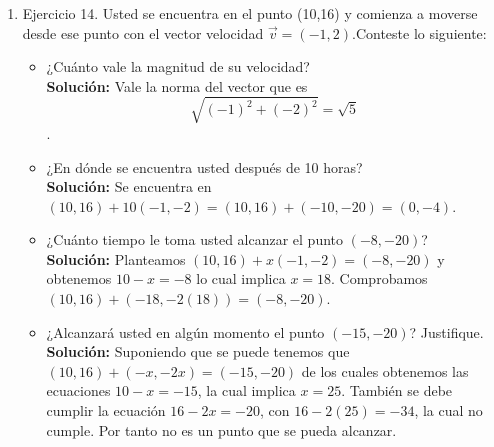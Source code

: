 \documentclass[10pt,letterpaper,fleqn]{article}
\begin{document}
\begin{enumerate}
\begin{enumerate}
        \end{enumerate}

        \item Ejercicio 14. Usted se encuentra en el punto (10,16) y comienza a moverse desde ese punto con el vector velocidad $\overrightarrow{v}=(-1,2)$.Conteste lo siguiente:
        \begin{itemize}

            \item ¿Cuánto vale la magnitud de su velocidad?\\
            \textbf{Solución:} Vale la norma del vector que es $$\sqrt{(-1)^2 + (-2)^2}=\sqrt{5}$$.

            \item ¿En dónde se encuentra usted después de 10 horas?\\
            \textbf{Solución:} Se encuentra en $(10,16)+10(-1,-2)=(10,16)+(-10,-20)=(0,-4)$.

            \item ¿Cuánto tiempo le toma usted alcanzar el punto $(-8,-20)$?\\
            \textbf{Solución:} Planteamos $(10,16)+x(-1,-2)=(-8,-20)$ y obtenemos $10-x=-8$ lo cual implica $x=18$. Comprobamos $(10,16)+(-18,-2(18))=(-8,-20)$.

            \item ¿Alcanzará usted en algún momento el punto $(-15,-20)$? Justifique.\\
            \textbf{Solución:} Suponiendo que se puede tenemos que $(10,16)+(-x,-2x)=(-15,-20)$ de los cuales obtenemos las ecuaciones $10-x=-15$, la cual implica $x=25$. También se debe cumplir la ecuación $16-2x=-20$, con $16-2(25)=-34$, la cual no cumple. Por tanto no es un punto que se pueda alcanzar.

        \end{itemize}

    \end{enumerate}
\end{document}
